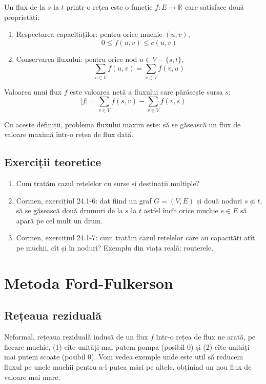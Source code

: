 \documentclass[../main.tex]{subfiles}
\begin{document}
\begin{definition}[Flux]
  Un flux de la $s$ la $t$ printr-o rețea este o funcție $f: E \to \mathbb{R}$ care satisface două proprietăți:
\end{definition}

\begin{enumerate}
  \item Respectarea capacităților: pentru orice muchie $(u,v)$, $$0 \leq f(u, v) \leq c(u,v)$$
  \item Conservarea fluxului: pentru orice nod $u \in V - \{s, t\}$, $$\sum_{v \in V}{f(u,v)} = \sum_{v \in V}{f(v,u)}$$
\end{enumerate}

\begin{definition}
  Valoarea unui flux $f$ este valoarea netă a fluxului care părăsește sursa $s$: $$|f| = \sum_{v \in V}{f(s,v)} - \sum_{v \in V}{f(v,s)}$$
\end{definition}

Cu aceste definiții, problema fluxului maxim este: să se găsească un flux de valoare maximă într-o rețea de flux dată.

\subsection{Exerciții teoretice}

\begin{enumerate}
  \item Cum tratăm cazul rețelelor cu surse și destinații multiple?
  \item Cormen, exercițiul 24.1-6: dat fiind un graf $G = (V,E)$ și două noduri $s$ și $t$, să se găsească două drumuri de la $s$ la $t$ astfel încît orice muchie $e \in E$ să apară pe cel mult un drum.
  \item Cormen, exercițiul 24.1-7: cum tratăm cazul rețelelor care au capacități atît pe muchii, cît și în noduri? Exemplu din viața reală: routerele.
\end{enumerate}

\section{Metoda Ford-Fulkerson}

\subsection{Rețeaua reziduală}

Neformal, rețeaua reziduală indusă de un flux $f$ într-o rețea de flux ne arată, pe fiecare muchie, (1) cîte unități mai putem pompa (posibil 0) și (2) cîte unități mai putem scoate (posibil 0). Vom vedea exemple unde este util să reducem fluxul pe unele muchii pentru a-l putea mări pe altele, obținînd un nou flux de valoare mai mare.
\end{document}
